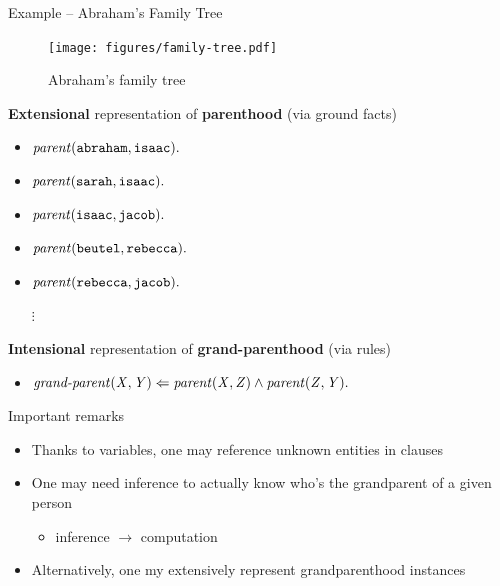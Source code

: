 \documentclass[presentation]{beamer}\mode<presentation>{\usetheme{AMSBolognaFC}}
\begin{document}
\begin{frame}[allowframebreaks]{Example -- Abraham's Family Tree}
    \begin{figure}
        \centering
        \caption{Abraham's family tree }
        \texttt{[image: figures/family-tree.pdf]}
    \end{figure}

    \framebreak

    \begin{block}{\textbf{Extensional} representation of \textbf{parenthood} (via ground facts)}
        \begin{itemize}
            \item $\text{\textit{parent}}(\mathtt{abraham}, \mathtt{isaac})\mathtt{.}$
            \item $\text{\textit{parent}}(\mathtt{sarah}, \mathtt{isaac})\mathtt{.}$
            \item $\text{\textit{parent}}(\mathtt{isaac}, \mathtt{jacob})\mathtt{.}$
            \item $\text{\textit{parent}}(\mathtt{beutel}, \mathtt{rebecca})\mathtt{.}$
            \item $\text{\textit{parent}}(\mathtt{rebecca}, \mathtt{jacob})\mathtt{.}$
            \item[$\vdots$]
        \end{itemize}
    \end{block}

    \framebreak

    \begin{block}{\textbf{Intensional} representation of \textbf{grand-parenthood} (via rules)}
        \begin{itemize}
            \item $\text{\textit{grand\text{-}parent}}(\mathit{X}, \mathit{Y}) \Leftarrow \text{\textit{parent}}(\mathit{X}, \mathit{Z}) \wedge \text{\textit{parent}}(\mathit{Z}, \mathit{Y}) \mathtt{.}$
        \end{itemize}
    \end{block}

    \begin{alertblock}{Important remarks}
        \begin{itemize}
            \item Thanks to \alert{variables}, one may reference unknown entities in clauses
            \item One may need \alert{inference} to actually know who's the grandparent of a given person
            \begin{itemize}
                \item inference $\rightarrow$ computation
            \end{itemize}
            \item Alternatively, one my \alert{extensively} represent grandparenthood instances
        \end{itemize}
    \end{alertblock}
\end{frame}
\end{document}
